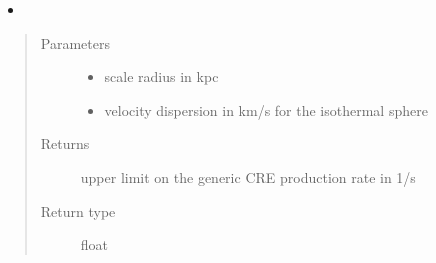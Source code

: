 \documentclass[letterpaper,10pt,english]{sphinxmanual}
\begin{document}
\begin{fulllineitems}
\begin{quote}
\begin{description}
\end{description}\end{quote}
\begin{itemize}
\item {} 
\sphinxAtStartPar
{}

\end{itemize}
\begin{quote}\begin{description}
\item[{Parameters}] \leavevmode\begin{itemize}
\item {} 
\sphinxAtStartPar
{} \textendash{} scale radius in kpc

\item {} 
\sphinxAtStartPar
{} \textendash{} velocity dispersion in km/s for the isothermal sphere {\hyperref[\detokenize{diffsph.profiles:diffsph.profiles.templates.sis}]{}}

\end{itemize}

\item[{Returns}] \leavevmode
\sphinxAtStartPar
upper limit on the generic CRE production rate in 1/s

\item[{Return type}] \leavevmode
\sphinxAtStartPar
float

\end{description}\end{quote}

\end{fulllineitems}

\end{document}
